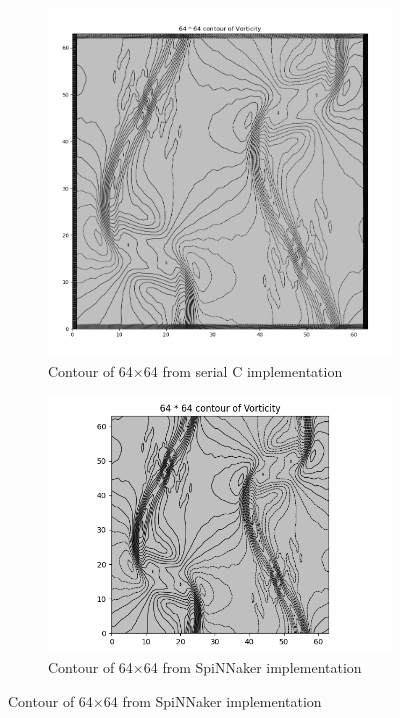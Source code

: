 \begin{figure}[htbp]  
\begin{subfigure}{0.43\textwidth}
\includegraphics[width=\linewidth]{figures/double_c_64.png}
\caption{Contour of 64$\times$64 from serial C implementation} \label{fig:a}
\end{subfigure}\hspace*{\fill}
\begin{subfigure}{0.57\textwidth}
\includegraphics[width=\linewidth]{figures/spinnaker_64.png}
\caption{Contour of 64$\times$64 from SpiNNaker implementation} \label{fig:b}
\end{subfigure}


\end{figure}
